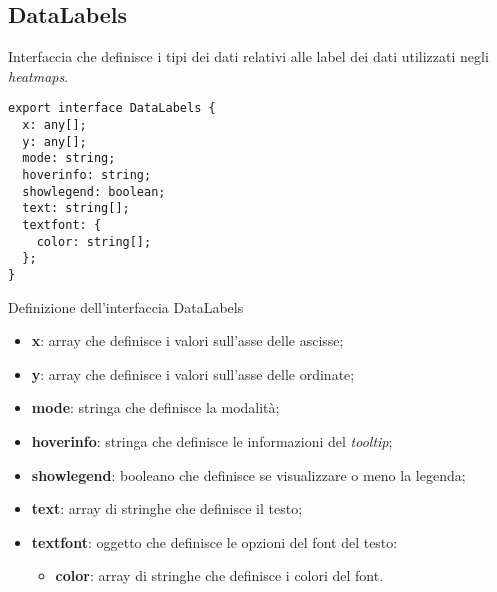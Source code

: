 \subsection{DataLabels}
Interfaccia che definisce i tipi dei dati relativi alle label dei dati utilizzati negli \textit{heatmaps}.

\begin{verbatim}
export interface DataLabels {
  x: any[];
  y: any[];
  mode: string;
  hoverinfo: string;
  showlegend: boolean;
  text: string[];
  textfont: {
    color: string[];
  };
}
\end{verbatim}
\begin{listing}[H]
      \caption{Definizione dell'interfaccia DataLabels}
      \label{listing:dataLabels}
\end{listing}
\begin{itemize}
      \item \textbf{x}: array che definisce i valori sull'asse delle ascisse;
      \item \textbf{y}: array che definisce i valori sull'asse delle ordinate;
      \item \textbf{mode}: stringa che definisce la modalità;
      \item \textbf{hoverinfo}: stringa che definisce le informazioni del \textit{tooltip};
      \item \textbf{showlegend}: booleano che definisce se visualizzare o meno la legenda;
      \item \textbf{text}: array di stringhe che definisce il testo;
      \item \textbf{textfont}: oggetto che definisce le opzioni del font del testo:
            \begin{itemize}
                  \item \textbf{color}: array di stringhe che definisce i colori del font.
            \end{itemize}
\end{itemize}

